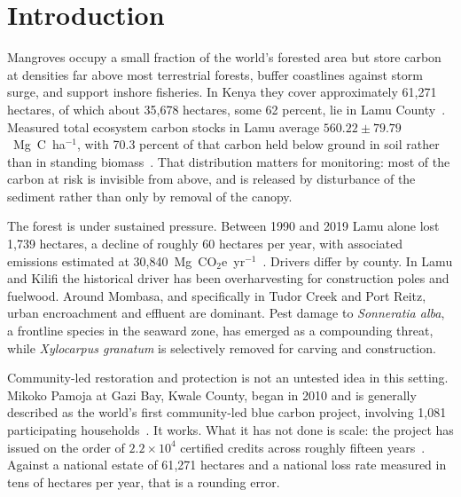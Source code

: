 \documentclass[10pt,twocolumn,a4paper]{article}
\begin{document}
\section{Introduction}

Mangroves occupy a small fraction of the world's forested area but store carbon
at densities far above most terrestrial forests, buffer coastlines against
storm surge, and support inshore fisheries. In Kenya they cover approximately
61{,}271 hectares, of which about 35{,}678 hectares, some 62 percent, lie in
Lamu County~\cite{kairo2021}. Measured total ecosystem carbon stocks in Lamu
average $560.22 \pm 79.79$~Mg~C~ha$^{-1}$, with 70.3 percent of that carbon
held below ground in soil rather than in standing
biomass~\cite{kairo2021}. That distribution matters for monitoring: most of the
carbon at risk is invisible from above, and is released by disturbance of the
sediment rather than only by removal of the canopy.

The forest is under sustained pressure. Between 1990 and 2019 Lamu alone lost
1{,}739 hectares, a decline of roughly 60 hectares per year, with associated
emissions estimated at 30{,}840~Mg~CO$_2$e~yr$^{-1}$~\cite{kairo2021}. Drivers
differ by county. In Lamu and Kilifi the historical driver has been
overharvesting for construction poles and fuelwood. Around Mombasa, and
specifically in Tudor Creek and Port Reitz, urban encroachment and effluent are
dominant. Pest damage to \emph{Sonneratia alba}, a frontline species in the
seaward zone, has emerged as a compounding threat, while \emph{Xylocarpus
granatum} is selectively removed for carving and construction.

Community-led restoration and protection is not an untested idea in this
setting. Mikoko Pamoja at Gazi Bay, Kwale County, began in 2010 and is generally
described as the world's first community-led blue carbon project, involving
1{,}081 participating households~\cite{planvivo}. It works. What it has not done
is scale: the project has issued on the order of $2.2 \times 10^{4}$ certified
credits across roughly fifteen years~\cite{planvivo}. Against a national estate
of 61{,}271 hectares and a national loss rate measured in tens of hectares per
year, that is a rounding error.
\end{document}
